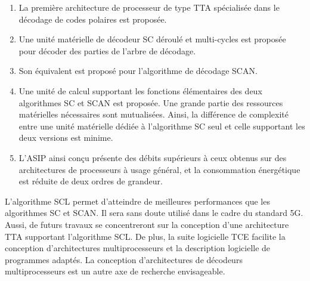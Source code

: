 \begin{enumerate}[label=(\roman*)]
  \item La première architecture de processeur de type TTA spécialisée dans le décodage de codes polaires est proposée.
  \item Une unité matérielle de décodeur SC déroulé et multi-cycles est proposée pour décoder des parties de l'arbre de décodage.
  \item Son équivalent est proposé pour l'algorithme de décodage SCAN.
  \item Une unité de calcul supportant les fonctions élémentaires des deux algorithmes SC et SCAN est proposée. Une grande partie des ressources matérielles nécessaires sont mutualisées. Ainsi, la différence de complexité entre une unité matérielle dédiée à l'algorithme SC seul et celle supportant les deux versions est minime.
  \item L'ASIP ainsi conçu présente des débits supérieurs à ceux obtenus sur des architectures de processeurs à usage général, et la consommation énergétique est réduite de deux ordres de grandeur.
\end{enumerate}

L'algorithme SCL permet d'atteindre de meilleures performances que les algorithmes SC et SCAN. Il sera sans doute utilisé dans le cadre du standard 5G. Aussi, de futurs travaux se concentreront sur la conception d'une architecture TTA supportant l'algorithme SCL. De plus, la suite logicielle TCE facilite la conception d'architectures multiprocesseurs et la description logicielle de programmes adaptés. La conception d'architectures de décodeurs multiprocesseurs est un autre axe de recherche envisageable.



